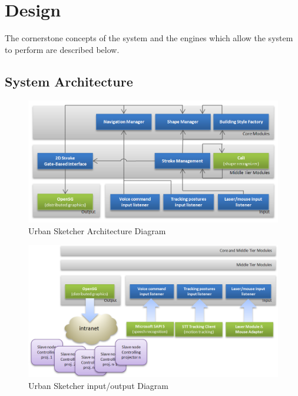 \chapter{Design}


The cornerstone concepts of the system and the engines which allow the system to perform are described below.


\section{System Architecture}

\begin{figure}[!ht]
		\centering
		\includegraphics[scale=0.4]{gfx/charts/internal-block-diagram.png}
		\caption{Urban Sketcher Architecture Diagram}
		\label{fig:block-diagram}
\end{figure}

\begin{figure}[!ht]
		\centering
		\includegraphics[scale=0.4]{gfx/charts/external-block-diagram.png}
		\caption{Urban Sketcher input/output Diagram}
		\label{fig:block-diagram}
\end{figure}


